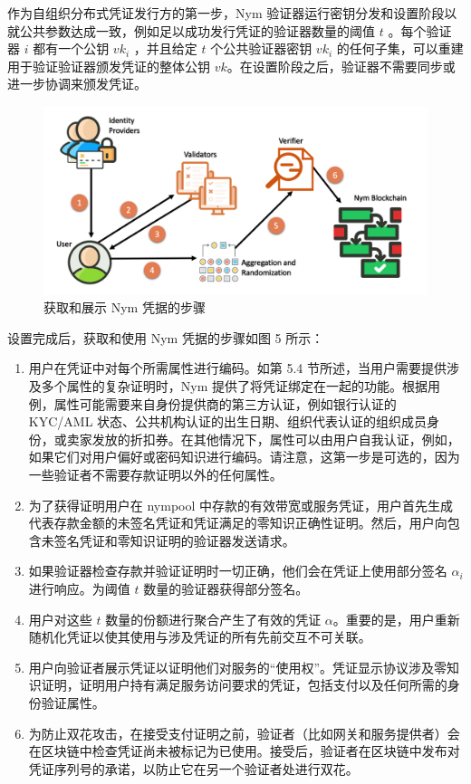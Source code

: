 \documentclass{article}
\begin{document}
	作为自组织分布式凭证发行方的第一步，Nym 验证器运行密钥分发和设置阶段以就公共参数达成一致，例如足以成功发行凭证的验证器数量的阈值 $t$ 。每个验证器 $i$ 都有一个公钥 $vk_{i}$ ，并且给定 $t$ 个公共验证器密钥 $vk_{i}$ 的任何子集，可以重建用于验证验证器颁发凭证的整体公钥 $vk$。在设置阶段之后，验证器不需要同步或进一步协调来颁发凭证。\newline
	
\begin{figure}
\centering
\includegraphics[width=1\textwidth]{image5.png} %
\caption{获取和展示 Nym 凭据的步骤} %
\label{图 5} %
\end{figure}

	设置完成后，获取和使用 Nym 凭据的步骤如图 5 所示：
	
\begin{enumerate}[1. ]
\item 用户在凭证中对每个所需属性进行编码。如第 5.4 节所述，当用户需要提供涉及多个属性的复杂证明时，Nym 提供了将凭证绑定在一起的功能。根据用例，属性可能需要来自身份提供商的第三方认证，例如银行认证的 KYC/AML 状态、公共机构认证的出生日期、组织代表认证的组织成员身份，或卖家发放的折扣券。在其他情况下，属性可以由用户自我认证，例如，如果它们对用户偏好或密码知识进行编码。请注意，这第一步是可选的，因为一些验证者不需要存款证明以外的任何属性。
\item 为了获得证明用户在 nympool 中存款的有效带宽或服务凭证，用户首先生成代表存款金额的未签名凭证和凭证满足的零知识正确性证明。然后，用户向包含未签名凭证和零知识证明的验证器发送请求。
\item 如果验证器检查存款并验证证明时一切正确，他们会在凭证上使用部分签名 $\alpha_{i}$ 进行响应。为阈值 $t$ 数量的验证器获得部分签名。
\item 用户对这些 $t$ 数量的份额进行聚合产生了有效的凭证 $\alpha$。重要的是，用户重新随机化凭证以使其使用与涉及凭证的所有先前交互不可关联。
\item 用户向验证者展示凭证以证明他们对服务的“使用权”。凭证显示协议涉及零知识证明，证明用户持有满足服务访问要求的凭证，包括支付以及任何所需的身份验证属性。
\item 为防止双花攻击，在接受支付证明之前，验证者（比如网关和服务提供者）会在区块链中检查凭证尚未被标记为已使用。接受后，验证者在区块链中发布对凭证序列号的承诺，以防止它在另一个验证者处进行双花。
\end{enumerate}
\end{document}
